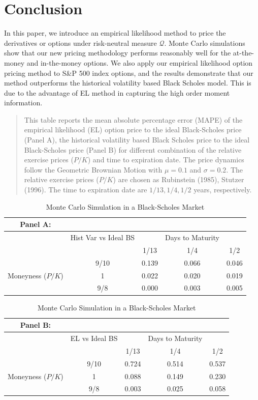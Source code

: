 \documentclass[oneside,english]{amsbook}
\numberwithin{section}{chapter}
\numberwithin{equation}{section}
\numberwithin{figure}{section}
\theoremstyle{plain}
\theoremstyle{plain}
\theoremstyle{definition}
\theoremstyle{plain}
\theoremstyle{plain}
\theoremstyle{remark}
\theoremstyle{definition}
\theoremstyle{definition}
\begin{document}
\section{Conclusion}
In this paper, we introduce an empirical likelihood method to price the derivatives or options under risk-neutral measure $\mathcal{Q}$. Monte Carlo simulations show that our new pricing methodology performs reasonably well for the at-the-money and in-the-money options. We also apply our empirical likelihood option pricing method to S\&P 500 index options, and the results demonstrate that our method outperforms the historical volatility based Black Scholes model. This is due to the advantage of EL method in capturing the high order moment information.

\begin{table}[t]
\centering \caption{ Monte Carlo Simulation in a Black-Scholes Market}

\begin{quote} %

This table reports the mean absolute percentage error (MAPE) of the empirical likelihood (EL) option price to the ideal Black-Scholes price (Panel A), the historical volatility based Black Scholes price to the ideal Black-Scholes price (Panel B) for different combination of the relative exercise prices ($P/K$) and time to expiration date. The price dynamics follow the Geometric Brownian Motion with $\mu=0.1$ and $\sigma=0.2$. The relative exercise prices ($P/K$) are chosen as Rubinstein (1985), Stutzer (1996). The time to expiration date are $1/13, 1/4, 1/2$ years, respectively.  
\end{quote}

\begin{tabular}{ccccc}
\noindent Panel A: &&&& \\

\hline\hline 
& Hist Var vs Ideal BS & & Days to Maturity &\tabularnewline
& & 1/13 & 1/4 & 1/2\tabularnewline
\hline 

& 9/10 & 0.139 & 0.066 & 0.046\tabularnewline

Moneyness ($P/K$) & 1 & 0.022 & 0.020 & 0.019\tabularnewline

& 9/8 & 0.000 & 0.003 & 0.005\tabularnewline \hline
\end{tabular}\newline\newline\newline


\begin{tabular}{ccccc}
\noindent Panel B: &&&& \\
\hline\hline 
& EL vs Ideal BS & & Days to Maturity &\tabularnewline
& & 1/13 & 1/4 & 1/2\tabularnewline
\hline 

& 9/10 & 0.724 & 0.514 & 0.537\tabularnewline

Moneyness ($P/K$) & 1 & 0.088 & 0.149 & 0.230\tabularnewline

& 9/8 & 0.003 & 0.025 & 0.058\tabularnewline \hline
\end{tabular}\newline

\end{table}
\end{document}
